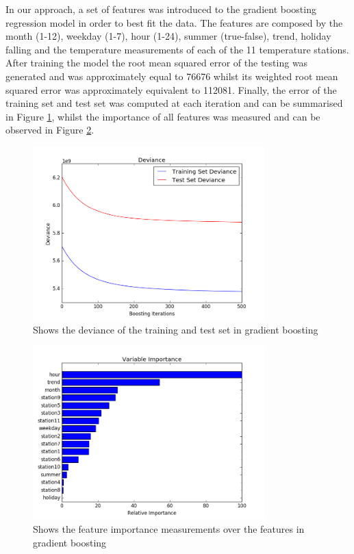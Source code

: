 \documentclass{article} %
\begin{document}
In our approach, a set of features was introduced to the gradient boosting regression model in order to best fit the data. The features are composed by the month (1-12), weekday (1-7), hour (1-24), summer (true-false), trend, holiday falling and the temperature measurements of each of the 11 temperature stations. After training the model the root mean squared error of the testing was generated and was approximately equal to 76676 whilst its weighted root mean squared error was approximately equivalent to 112081. Finally, the error of the training set and test set was computed at each iteration and can be summarised in Figure \ref{fig:deviance}, whilst the importance of all features was measured and can be observed in Figure \ref{fig:boost_imp}.
\begin{figure}[H]
  \centering
    \includegraphics[width=0.80\textwidth]{deviance}
  \caption{Shows the deviance of the training and test set in gradient boosting}
  \label{fig:deviance}
\end{figure}
\begin{figure}[H]
  \centering
    \includegraphics[width=0.80\textwidth]{boost_imp}
  \caption{Shows the feature importance measurements over the features in gradient boosting}
  \label{fig:boost_imp}
\end{figure}
\end{document}
